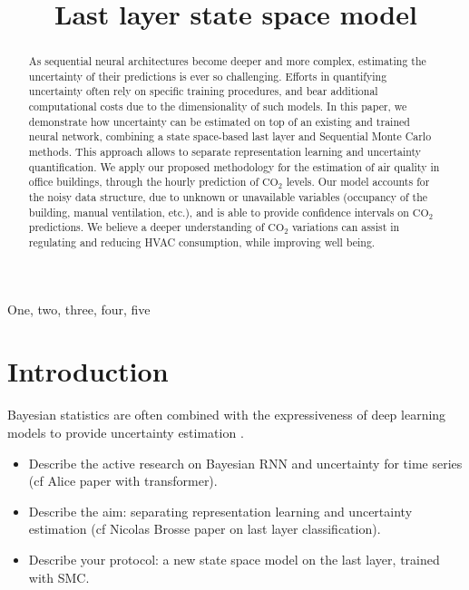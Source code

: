 \documentclass{article}
\title{Last layer state space model}
\begin{document}
\maketitle

\begin{abstract}
	As sequential neural architectures become deeper and more complex, estimating the uncertainty of their predictions is ever so challenging.
	Efforts in quantifying uncertainty often rely on specific training procedures, and bear additional computational costs due to the dimensionality of such models.
	In this paper, we demonstrate how uncertainty can be estimated on top of an existing and trained neural network, combining a state space-based last  layer and  Sequential Monte Carlo methods. This approach allows to separate representation learning and uncertainty quantification. We apply our proposed methodology for the estimation of air quality in office buildings, through the hourly prediction of \ensuremath{\mathrm{CO_2}} levels.
	Our model accounts for the noisy data structure, due to unknown or unavailable variables (occupancy of the building, manual ventilation, etc.), and is able to provide confidence intervals on \ensuremath{\mathrm{CO_2}} predictions.
	We believe a deeper understanding of \ensuremath{\mathrm{CO_2}} variations can assist in regulating and reducing HVAC consumption, while improving well being.
\end{abstract}

\begin{keywords}
	One, two, three, four, five
\end{keywords}

\section{Introduction}
\label{sec:intro}

Bayesian statistics are often combined with the expressiveness of deep learning models to provide uncertainty estimation \cite{Hinton1995BayesianLF,MacKay1992}.


\begin{itemize}
	\item Describe the active research on Bayesian RNN and uncertainty for time series (cf Alice paper with transformer).
	\item Describe the aim: separating  representation learning and uncertainty estimation (cf Nicolas Brosse paper on last layer classification).
	\item Describe your protocol: a new state space model on the last layer, trained with SMC.
\end{itemize}
\end{document}
